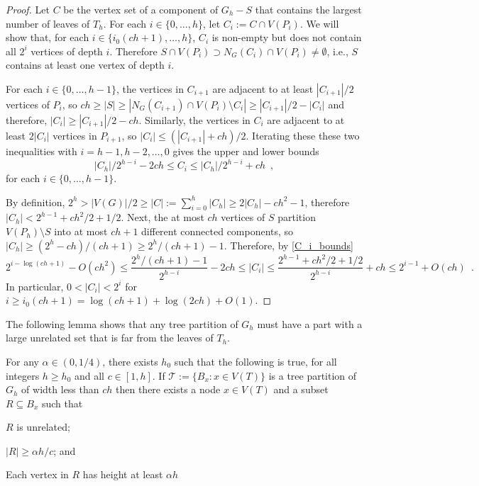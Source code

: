 \documentclass{patmorin}
\renewcommand{\le}{\leqslant}
\renewcommand{\ge}{\geqslant}
\begin{document}
\begin{proof}
  Let $C$ be the vertex set of a component of $G_h-S$ that contains the largest number of leaves of $T_h$.  For each $i\in\{0,\ldots,h\}$, let $C_i:=C\cap V(P_i)$. We will show that, for each $i\in\{i_0(ch+1),\ldots,h\}$, $C_i$ is non-empty but does not contain all $2^i$ vertices of depth $i$.  Therefore $S\cap V(P_i)\supset N_G(C_i)\cap V(P_i)\neq\emptyset$, i.e., $S$ contains at least one vertex of depth $i$.

  For each $i\in\{0,\ldots,h-1\}$, the vertices in $C_{i+1}$ are adjacent to at least $|C_{i+1}|/2$ vertices of $P_{i}$, so $ch \ge |S| \ge |N_G(C_{i+1})\cap V(P_i)\setminus C_{i}| \ge |C_{i+1}|/2 - |C_{i}|$ and therefore, $|C_{i}| \ge |C_{i+1}|/2 - ch$.  Similarly, the vertices in $C_i$ are adjacent to at least $2|C_i|$ vertices in $P_{i+1}$, so $|C_i|\le (|C_{i+1}| + ch)/2$.  Iterating these these two inequalities with $i=h-1,h-2,\ldots,0$ gives the upper and lower bounds
  \begin{equation}
    |C_h|/2^{h-i} - 2ch \le C_{i} \le |C_h|/2^{h-i} + ch   \enspace ,
    \label{C_i_bounds}
  \end{equation}
  for each $i\in\{0,\ldots,h-1\}$.

  By definition, $2^h >|V(G)|/2 \ge |C| := \sum_{i=0}^h |C_h| \ge 2|C_h|-ch^2-1$, therefore $|C_h| < 2^{h-1} + ch^2/2 + 1/2$.  Next, the at most $ch$ vertices of $S$ partition $V(P_h)\setminus S$ into at most $ch+1$ different connected components, so $|C_h| \ge (2^h-ch)/(ch+1) \ge 2^{h}/(ch+1) - 1$.  Therefore, by \cref{C_i_bounds}
  \[
      2^{i-\log(ch+1)} - O(ch^2) \le \frac{2^h/(ch+1)-1}{2^{h-i}} - 2ch \le |C_i|
      \le \frac{2^{h-1}+ch^2/2 + 1/2}{2^{h-i}} + ch \le 2^{i-1} + O(ch)
      \enspace .
  \]
  In particular, $0 < |C_i| < 2^i$ for $i\ge i_0(ch+1)= \log (ch+1) + \log(2ch)+O(1)$.
\end{proof}


The following lemma shows that any tree partition of $G_h$ must have a part with a large unrelated set that is far from the leaves of $T_h$.

\begin{lem}\label{startup}
  For any $\alpha\in(0,1/4)$, there exists $h_0$ such that the following is true, for all integers $h\ge  h_0$ and all $c\in[1,h]$.  If $\mathcal{T}:=\{B_x:x\in V(T)\}$ is a tree partition of $G_h$ of width less than $ch$ then there exists a node $x\in V(T)$ and a subset $R\subseteq B_x$ such that
  \begin{compactenum}[(i)]
    \item $R$ is unrelated;
    \item $|R|\ge \alpha h/c$; and
    \item Each vertex in $R$ has height at least $\alpha h$
  \end{compactenum}
\end{lem}
\end{document}
